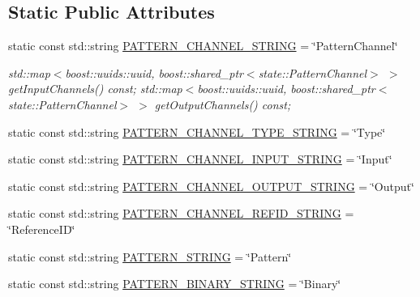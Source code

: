 \subsection*{\-Static \-Public \-Attributes}
\begin{DoxyCompactItemize}
\item 
static const std\-::string \hyperlink{classcryomesh_1_1utilities_1_1SequencerChannels_a0a94a00246a8cb5052e20b273aa63ecc}{\-P\-A\-T\-T\-E\-R\-N\-\_\-\-C\-H\-A\-N\-N\-E\-L\-\_\-\-S\-T\-R\-I\-N\-G} = \char`\"{}\-Pattern\-Channel\char`\"{}
\begin{DoxyCompactList}\small\item\em std\-::map$<$boost\-::uuids\-::uuid, boost\-::shared\-\_\-ptr$<$state\-::\-Pattern\-Channel$>$ $>$ get\-Input\-Channels() const; std\-::map$<$boost\-::uuids\-::uuid, boost\-::shared\-\_\-ptr$<$state\-::\-Pattern\-Channel$>$ $>$ get\-Output\-Channels() const; \end{DoxyCompactList}\item 
static const std\-::string \hyperlink{classcryomesh_1_1utilities_1_1SequencerChannels_ab69f3d411d94dee36c11a2134a637462}{\-P\-A\-T\-T\-E\-R\-N\-\_\-\-C\-H\-A\-N\-N\-E\-L\-\_\-\-T\-Y\-P\-E\-\_\-\-S\-T\-R\-I\-N\-G} = \char`\"{}\-Type\char`\"{}
\item 
static const std\-::string \hyperlink{classcryomesh_1_1utilities_1_1SequencerChannels_ab72f25d6750d6254128f8d886418de2d}{\-P\-A\-T\-T\-E\-R\-N\-\_\-\-C\-H\-A\-N\-N\-E\-L\-\_\-\-I\-N\-P\-U\-T\-\_\-\-S\-T\-R\-I\-N\-G} = \char`\"{}\-Input\char`\"{}
\item 
static const std\-::string \hyperlink{classcryomesh_1_1utilities_1_1SequencerChannels_aa4d6a5f2a37779ecac5bda7fb9fd24c0}{\-P\-A\-T\-T\-E\-R\-N\-\_\-\-C\-H\-A\-N\-N\-E\-L\-\_\-\-O\-U\-T\-P\-U\-T\-\_\-\-S\-T\-R\-I\-N\-G} = \char`\"{}\-Output\char`\"{}
\item 
static const std\-::string \hyperlink{classcryomesh_1_1utilities_1_1SequencerChannels_a4db3a0bf3a77b8c69ba2562a7a790d74}{\-P\-A\-T\-T\-E\-R\-N\-\_\-\-C\-H\-A\-N\-N\-E\-L\-\_\-\-R\-E\-F\-I\-D\-\_\-\-S\-T\-R\-I\-N\-G} = \char`\"{}\-Reference\-I\-D\char`\"{}
\item 
static const std\-::string \hyperlink{classcryomesh_1_1utilities_1_1SequencerChannels_adc4ea1f64be75191056ad9e7d21e72ee}{\-P\-A\-T\-T\-E\-R\-N\-\_\-\-S\-T\-R\-I\-N\-G} = \char`\"{}\-Pattern\char`\"{}
\item 
static const std\-::string \hyperlink{classcryomesh_1_1utilities_1_1SequencerChannels_aa231bb9f26544bb55eb4c3b7135379c4}{\-P\-A\-T\-T\-E\-R\-N\-\_\-\-B\-I\-N\-A\-R\-Y\-\_\-\-S\-T\-R\-I\-N\-G} = \char`\"{}\-Binary\char`\"{}

\end{DoxyCompactItemize}
